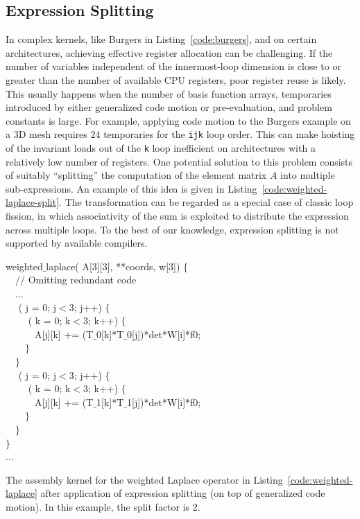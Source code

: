 \subsection{Expression Splitting}
\label{sec:coffee-split}

In complex kernels, like Burgers in Listing~\ref{code:burgers}, and on certain architectures, achieving effective register allocation can be challenging. If the number of variables independent of the innermost-loop dimension is close to or greater than the number of available CPU registers, poor register reuse is likely. This usually happens when the number of basis function arrays, temporaries introduced by either generalized code motion or pre-evaluation, and problem constants is large. For example, applying code motion to the Burgers example on a 3D mesh requires 24 temporaries for the \texttt{ijk} loop order. This can make hoisting of the invariant loads out of the \texttt{k} loop inefficient on architectures with a relatively low number of registers. One potential solution to this problem consists of suitably ``splitting'' the computation of the element matrix $A$ into multiple sub-expressions. An example of this idea is given in Listing~\ref{code:weighted-laplace-split}. The transformation can be regarded as a special case of classic loop fission, in which associativity of the sum is exploited to distribute the expression across multiple loops. To the best of our knowledge, expression splitting is not supported by available compilers.

\begin{algorithm}
\scriptsize\ttfamily
{}

 weighted$\_$laplace( A[3][3],  **coords,  w[3]) $\lbrace$\\
~~// Omitting redundant code \\
~~...\\
~~ ( j = 0; j$<$3; j++) $\lbrace$\\
~~~~ ( k = 0; k$<$3; k++) $\lbrace$\\
~~~~~~A[j][k] += (T$\_$0[k]*T$\_$0[j])*det*W[i]*f0;\\
~~~~$\rbrace$\\
~~$\rbrace$\\
~~ ( j = 0; j$<$3; j++) $\lbrace$\\
~~~~ ( k = 0; k$<$3; k++) $\lbrace$\\
~~~~~~A[j][k] += (T$\_$1[k]*T$\_$1[j])*det*W[i]*f0;\\
~~~~$\rbrace$\\
~~$\rbrace$\\
$\rbrace$\\
...
\caption{The assembly kernel for the weighted Laplace operator in Listing~\ref{code:weighted-laplace} after application of expression splitting (on top of generalized code motion). In this example, the split factor is 2.}
\label{code:weighted-laplace-split}
\end{algorithm}

